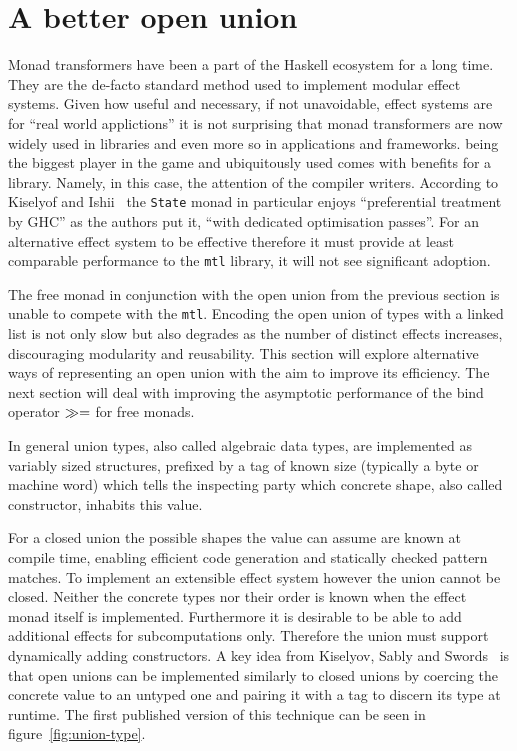 \section{A better open union}

\label{sec:better-open-union}

Monad transformers have been a part of the Haskell ecosystem for a long time.
They are the de-facto standard method used to implement modular effect systems.
Given how useful and necessary, if not unavoidable, effect systems are for
``real world applictions'' it is not surprising that monad transformers are now
widely used in libraries and even more so in applications and frameworks. being
the biggest player in the game and ubiquitously used comes with benefits for a
library. Namely, in this case, the attention of the compiler writers. According
to Kiselyof and Ishii~\cite{freer} the \texttt{State} monad in particular
enjoys ``preferential treatment by GHC'' as the authors put it, ``with dedicated
optimisation passes''. For an alternative effect system to be effective
therefore it must provide at least comparable performance to the \texttt{mtl}
library, it will not see significant adoption.

The free monad in conjunction with the open union from the previous section is
unable to compete with the \texttt{mtl}. Encoding the open union of types with a
linked list is not only slow but also degrades as the number of distinct effects
increases, discouraging modularity and reusability. This section will explore
alternative ways of representing an open union with the aim to improve its
efficiency. The next section will deal with improving the asymptotic performance
of the bind operator $\gg=$ for free monads.

In general union types, also called algebraic data types, are implemented as
variably sized structures, prefixed by a tag of known size (typically a byte or
machine word) which tells the inspecting party which concrete shape, also called
constructor, inhabits this value.

For a closed union the possible shapes the value can assume are known at compile
time, enabling efficient code generation and statically checked pattern matches.
To implement an extensible effect system however the union cannot be closed.
Neither the concrete types nor their order is known when the effect monad itself
is implemented. Furthermore it is desirable to be able to add additional effects
for subcomputations only. Therefore the union must support dynamically adding
constructors. A key idea from Kiselyov, Sably and
Swords~\cite{extensible-effects} is that open unions can be implemented
similarly to closed unions by coercing the concrete value to an untyped one and
pairing it with a tag to discern its type at runtime. The first published
version of this technique can be seen in figure~\ref{fig:union-type}.

